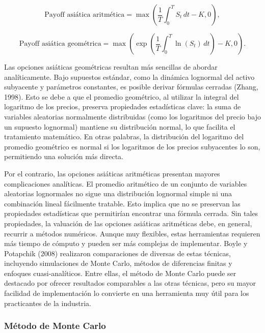 \documentclass[11pt,a4paper,spanish]{article}
\numberwithin{equation}{section} %
\begin{document}
\begin{equation}
\text{Payoff asiática aritmética} = \max\left( \frac{1}{T}\int_0^T S_t \, dt - K, 0 \right),
\end{equation}

\begin{equation}
\text{Payoff asiática geométrica} = \max\left( \exp\left(\frac{1}{T} \int_0^T \ln(S_t) \, dt\right) - K, 0 \right).
\end{equation}

Las opciones asiáticas geométricas resultan más sencillas de abordar analíticamente. Bajo supuestos estándar, como la dinámica lognormal del activo subyacente y parámetros constantes, es posible derivar fórmulas cerradas (Zhang, 1998). Esto se debe a que el promedio geométrico, al utilizar la integral del logaritmo de los precios, preserva propiedades estadísticas clave: la suma de variables aleatorias normalmente distribuidas (como los logaritmos del precio bajo un supuesto lognormal) mantiene su distribución normal, lo que facilita el tratamiento matemático. En otras palabras, la distribución del logaritmo del promedio geométrico es normal si los logaritmos de los precios subyacentes lo son, permitiendo una solución más directa.

Por el contrario, las opciones asiáticas aritméticas presentan mayores complicaciones analíticas. El promedio aritmético de un conjunto de variables aleatorias lognormales no sigue una distribución lognormal simple ni una combinación lineal fácilmente tratable. Esto implica que no se preservan las propiedades estadísticas que permitirían encontrar una fórmula cerrada. Sin tales propiedades, la valuación de las opciones asiáticas aritméticas debe, en general, recurrir a métodos numéricos. Aunque muy flexibles, estas herramientas requieren más tiempo de cómputo y pueden ser más complejas de implementar. Boyle y Potapchik (2008) realizaron comparaciones de diversas de estas técnicas, incluyendo simulaciones de Monte Carlo, métodos de diferencias finitas y enfoques cuasi-analíticos. Entre ellas, el método de Monte Carlo puede ser destacado por ofrecer resultados comparables a las otras técnicas, pero su mayor facilidad de implementación lo convierte en una herramienta muy útil para los practicantes de la industria.


\subsubsection{Método de Monte Carlo}\label{subsubsec:metodo-monte-carlo}
\end{document}
